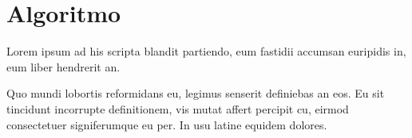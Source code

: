 \chapter[Algoritmo]{Algoritmo}\label{ch:capitulo3}
\fpar

\parindent=0pt Lorem ipsum ad his scripta blandit partiendo, eum fastidii accumsan euripidis in, eum liber hendrerit an. 

\vspace{0.5cm}
\parindent=30pt Quo mundi lobortis reformidans eu, legimus senserit definiebas an eos. Eu sit tincidunt incorrupte definitionem, vis mutat affert percipit cu, eirmod consectetuer signiferumque eu per. In usu latine equidem dolores.